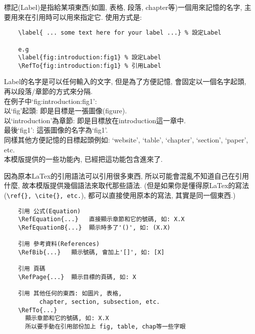 標記(Label)是指給某項東西(如圖, 表格, 段落, chapter等)一個用來記憶的名字, 主要用來在引用時可以用來指定它. 使用方式是:\\

  \begin{DescriptionFrame}
  \begin{verbatim}
    \label{ ... some text here for your label ...} % 設定Label

    e.g
    \label{fig:introduction:fig1} % 設定Label
    \RefTo{fig:introduction:fig1} % 引用Label
  \end{verbatim}
  \end{DescriptionFrame}

\noindent Label的名字是可以任何輸入的文字, 但是為了方便記憶, 會固定以一個名字起頭, 再以段落/章節的方式來分隔.\\

\noindent 在例子中`fig:introduction:fig1':\\
以`fig'起頭: 即是目標是一張圖像(figure).\\
以`introduction'為章節: 即是目標放在introduction這一章中.\\
最後`fig1': 這張圖像的名字為`fig1'.\\

\noindent 同樣其他方便記憶的目標起頭例如: `website', `table', `chapter', `section', `paper', etc.\\

\noindent 本模版提供的一些功能內, 已經把這功能包含進來了.

\newpage
{}
因為原本LaTex的引用語法可以引用很多東西, 所以可能會混亂不知道自己在引用什麼, 故本模版提供幾個語法來取代那些語法. (但是如果你是懂得原LaTex的寫法(\verb|\ref{}, \cite{}, etc.|), 都可以直接使用原本的寫法, 其實是同一個東西.)\\

  \begin{DescriptionFrame}
  \begin{verbatim}
    引用 公式(Equation)
    \RefEquation{...}   直接顯示章節和它的號碼, 如: X.X
    \RefEquationB{...}  顯示時多了'()', 如: (X.X)

    引用 參考資料(References)
    \RefBib{...}   顯示號碼, 會加上'[]', 如: [X]

    引用 頁碼
    \RefPage{...}  顯示目標的頁碼, 如: X

    引用 其他任何的東西: 如圖片, 表格,
          chapter, section, subsection, etc.
    \RefTo{...}
      顯示章節和它的號碼, 如: X.X
      所以要手動在引用部份加上 fig, table, chap等一些字眼
  \end{verbatim}
  \end{DescriptionFrame}

